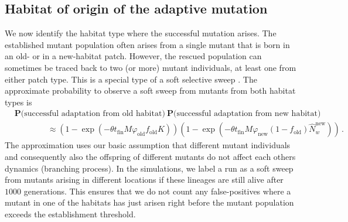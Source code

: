 \documentclass[a4paper,11pt]{article}
\newcommand{\chg}[1]{\textcolor{change}{#1}}
\begin{document}
\subsection*{Habitat of origin of the adaptive mutation}
We now identify the habitat type where the successful mutation arises. The established mutant population often arises from a single mutant that is born in an old- or in a new-habitat patch. However, the rescued population can sometimes be traced back to two (or more) mutant individuals, \chg{at least} one from either patch type. \chg{This is a special type of a soft selective sweep \citep[see][for a review]{hermisson_2017}. The approximate probability to observe a soft sweep from mutants from both habitat types is 
\begin{equation}\label{eq:origin}
    \begin{aligned}
	&\mathbf{P}\big(\text{successful adaptation from old habitat}\big)\ \mathbf{P}\big(\text{successful adaptation from new habitat}\big) \\
	& \qquad \qquad \approx \left(1 - \exp\left(-\theta t_{\text{fin}} M \varphi_{\text{old}} f_{\text{old}} K\right)\right)\left(1- \exp\left(-\theta t_{\text{fin}} M \varphi_{\text{new}} (1-f_{\text{old}}) \widehat{N}_w^{\text{new}}\right)\right)\, .
	\end{aligned}
\end{equation} 
}
\chg{The approximation uses our basic assumption that different mutant individuals and consequently also the offspring of different mutants do not affect each others dynamics (branching process). In the simulations, we label a run as a soft sweep from mutants arising in different locations if these lineages are still alive after $1000$ generations. This ensures that we do not count any false-positives where a mutant in one of the habitats has just arisen right before the mutant population exceeds the establishment threshold.}
\end{document}
